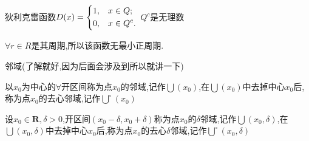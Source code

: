 \documentclass[UTF8]{ctexart}
\begin{document}
狄利克雷函数$D(x) = \begin{dcases}
  1,&x \in Q;\\0,&x \in Q^c.    
  \end{dcases}$
$Q^c$是无理数

$\forall r \in R$是其周期,所以该函数无最小正周期.

邻域(了解就好,因为后面会涉及到所以就讲一下)

以$x_{0}$为中心的$\forall $开区间称为点$x_{0}$的邻域,记作$\bigcup (x_{0})$,在$\bigcup (x_{0})$中去掉中心$x_{0}$后,称为点$x_{0}$的去心邻域,记作$\bigcup \limits^{\circ }(x_{0})$

设$x_{0}\in \mathbf{R} ,\delta >0$,开区间$(x_{0}-\delta ,x_{0}+\delta ) $称为点$x_{0}$的$\delta $邻域,记作$\bigcup (x_{0},\delta )$,在$\bigcup (x_{0},\delta )$中去掉中心$x_{0}$后,称为点$x_{0}$的去心$\delta $邻域,记作$\bigcup \limits^{\circ }(x_{0},\delta )$
\end{document}

